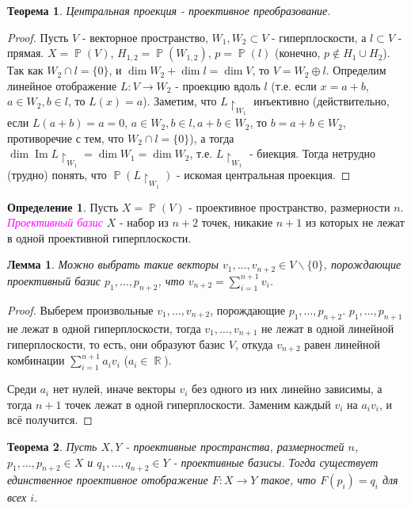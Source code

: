\documentclass[a4paper,100pt]{article}
\theoremstyle{indented}
\newtheorem{theorem}{Теорема}
\newtheorem{lemma}{Лемма}
\theoremstyle{definition}
\newtheorem{defn}{Определение}
\theoremstyle{remark}
\DeclareMathOperator{\ra}{\rightarrow}
\DeclareMathOperator{\Imf}{Im}
\DeclareMathOperator{\RR}{\mathbb{R}}
\DeclareMathOperator{\PP}{\mathbb{P}}
\begin{document}
\begin{theorem}
    Центральная проекция - проективное преобразование.
\end{theorem}
    
\begin{proof}
    Пусть $V$ - векторное пространство, $W_1, W_2 \subset V$ - гиперплоскости, а $l \subset V$ - прямая. $X=\PP(V)$, $H_{1, 2}=\PP(W_{1, 2})$, $p=\PP(l)$ (конечно, $p \notin H_1 \cup H_2$). Так как $W_2 \cap l = \{0\}$, и $\dim W_2 + \dim l = \dim V$, то $V=W_2 \oplus l$. Определим линейное отображение $L: V \rightarrow W_2$ - проекцию вдоль $l$ (т.е. если $x=a+b$, $a \in W_2, b \in l$, то $L(x)=a$). Заметим, что $L \upharpoonright_{W_1}$ инъективно (действительно, если $L(a+b)=a=0$, $a \in W_2, b \in l, a+b \in W_2$, то $b=a+b \in W_2$, противоречие с тем, что $W_2 \cap l = \{0\}$), а тогда $\dim \Imf L \upharpoonright_{W_1} = \dim W_1 = \dim W_2$, т.е. $L \upharpoonright_{W_1}$ - биекция. Тогда нетрудно (трудно) понять, что $\PP(L \upharpoonright_{W_1})$ - искомая центральная проекция.
\end{proof}

\begin{defn}
    Пусть $X = \PP(V)$ - проективное пространство, размерности $n$. \textit{\textcolor{magenta}{\hypertarget{s45}{Проективный базис}}} $X$ - набор из $n+2$ точек, никакие $n+1$ из которых не лежат в одной проективной гиперплоскости.
\end{defn}

\begin{lemma}
    Можно выбрать такие векторы $v_1, \ldots, v_{n+2}\in V\backslash \{0\}$, порождающие проективный базис $p_1, \ldots, p_{n+2}$, что $v_{n+2}=\sum_{i=1}^{n+1}v_i$. 
\end{lemma} 

\begin{proof}
    Выберем произвольные $v_1, \ldots, v_{n+2}$, порождающие $p_1, \ldots, p_{n+2}$. $p_1, \ldots, p_{n+1}$ не лежат в одной гиперплоскости, тогда $v_1, \ldots, v_{n+1}$ не лежат в одной линейной гиперплоскости, то есть, они образуют базис $V$, откуда $v_{n+2}$ равен линейной комбинации $\sum_{i =1}^{n+1} a_i v_i$ ($a_i \in \RR$). \ 
    
    Среди $a_i$ нет нулей, иначе векторы $v_i$ без одного из них линейно зависимы, а тогда $n+1$ точек лежат в одной гиперплоскости. Заменим каждый $v_i$ на $a_i v_i$, и всё получится.
\end{proof}

\begin{theorem}
    Пусть $X, Y$ - проективные пространства, размерностей $n$, $p_1, \ldots, p_{n+2}\in X$ и $q_1, \ldots, q_{n+2}\in Y$ - проективные базисы. Тогда существует единственное проективное отображение $F: X\ra Y$ такое, что $F(p_i)=q_i$ для всех $i$. 
\end{theorem}
\end{document}
